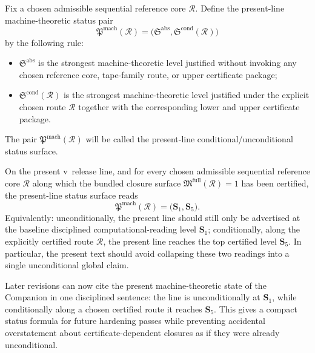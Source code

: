 \begin{definition}
Fix a chosen admissible sequential reference core \(\mathcal R\). Define the present-line machine-theoretic status pair
\[
\mathfrak P^{\mathrm{mach}}(\mathcal R)=\bigl(\mathfrak S^{\mathrm{abs}},\mathfrak S^{\mathrm{cond}}(\mathcal R)\bigr)
\]
by the following rule:
\begin{itemize}[leftmargin=2em]
  \item \(\mathfrak S^{\mathrm{abs}}\) is the strongest machine-theoretic level justified without invoking any chosen reference core, tape-family route, or upper certificate package;
  \item \(\mathfrak S^{\mathrm{cond}}(\mathcal R)\) is the strongest machine-theoretic level justified under the explicit chosen route \(\mathcal R\) together with the corresponding lower and upper certificate package.
\end{itemize}
The pair \(\mathfrak P^{\mathrm{mach}}(\mathcal R)\) will be called the present-line conditional/unconditional status surface.
\end{definition}

\begin{proposition}
On the present v\docversion\ release line, and for every chosen admissible sequential reference core \(\mathcal R\) along which the bundled closure surface \(\mathfrak M^{\mathrm{full}}(\mathcal R)=1\) has been certified, the present-line status surface reads
\[
\mathfrak P^{\mathrm{mach}}(\mathcal R)=\bigl(\mathbf S_1,\mathbf S_5\bigr).
\]
Equivalently: unconditionally, the present line should still only be advertised at the baseline disciplined computational-reading level \(\mathbf S_1\); conditionally, along the explicitly certified route \(\mathcal R\), the present line reaches the top certified level \(\mathbf S_5\). In particular, the present text should avoid collapsing these two readings into a single unconditional global claim.
\end{proposition}

\begin{corollary}
Later revisions can now cite the present machine-theoretic state of the Companion in one disciplined sentence: the line is unconditionally at \(\mathbf S_1\), while conditionally along a chosen certified route it reaches \(\mathbf S_5\). This gives a compact status formula for future hardening passes while preventing accidental overstatement about certificate-dependent closures as if they were already unconditional.
\end{corollary}

